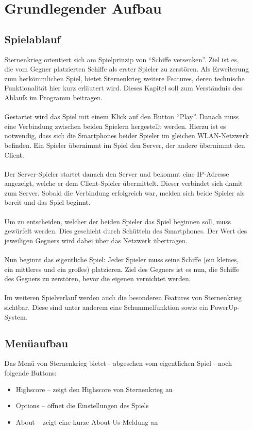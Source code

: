 \documentclass[11pt]{article} %
\begin{document}
\newpage

\section{Grundlegender Aufbau}
\subsection{Spielablauf}
Sternenkrieg orientiert sich am Spielprinzip von \enquote{Schiffe versenken}. Ziel ist es, die vom Gegner platzierten Schiffe als erster Spieler zu zerstören. Als Erweiterung zum herkömmlichen Spiel, bietet Sternenkrieg weitere Features, deren technische Funktionalität hier kurz erläutert wird. Dieses Kapitel soll zum Verständnis des Ablaufs im Programm beitragen.
\\\\
Gestartet wird das Spiel mit einem Klick auf den Button \enquote{Play}. Danach muss eine Verbindung zwischen beiden Spielern hergestellt werden. Hierzu ist es notwendig, dass sich die Smartphones beider Spieler im gleichen WLAN-Netzwerk befinden. Ein Spieler übernimmt im Spiel den Server, der andere übernimmt den Client.
\\\\
Der Server-Spieler startet danach den Server und bekommt eine IP-Adresse angezeigt, welche er dem Client-Spieler übermittelt. Dieser verbindet sich damit zum Server. Sobald die Verbindung erfolgreich war, melden sich beide Spieler als bereit und das Spiel beginnt.
\\\\
Um zu entscheiden, welcher der beiden Spieler das Spiel beginnen soll, muss gewürfelt werden. Dies geschieht durch Schütteln des Smartphones. Der Wert des jeweiligen Gegners wird dabei über das Netzwerk übertragen.
\\\\
Nun beginnt das eigentliche Spiel: Jeder Spieler muss seine Schiffe (ein kleines, ein mittleres und ein großes) platzieren. Ziel des Gegners ist es nun, die Schiffe des Gegners zu zerstören, bevor die eigenen vernichtet werden.
\\\\
Im weiteren Spielverlauf werden auch die besonderen Features von Sternenkrieg sichtbar. Diese sind unter anderem eine Schummelfunktion sowie ein PowerUp-System.

\subsection{Menüaufbau}
Das Menü von Sternenkrieg bietet - abgesehen vom eigentlichen Spiel - noch folgende Buttons:
\begin{itemize}
\item Highscore -- zeigt den Highscore von Sternenkrieg an
\item Options -- öffnet die Einstellungen des Spiels
\item About -- zeigt eine kurze About Us-Meldung an
\end{itemize}
\end{document}
